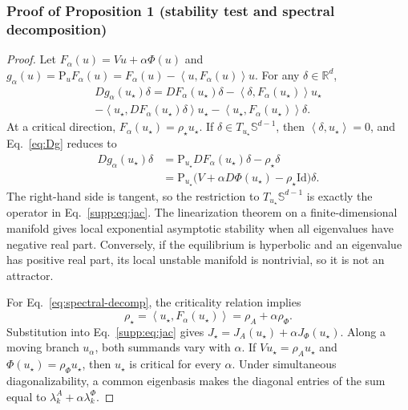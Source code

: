 \documentclass[11pt]{article}
\newcommand{\R}{\mathbb{R}}
\newcommand{\Sph}{\mathbb{S}}
\newcommand{\ip}[2]{\left\langle #1,#2 \right\rangle}
\newcommand{\Proj}{\mathrm{P}}
\newcommand{\id}{\mathrm{Id}}
\begin{document}
\subsubsection{Proof of Proposition 1 (stability test and spectral decomposition)}
\begin{proof}
Let
$F_\alpha(u)=Vu+\alpha\Phi(u)$ and
$g_\alpha(u)=\Proj_uF_\alpha(u)=F_\alpha(u)-\ip{u}{F_\alpha(u)}u$. For any
$\delta\in\R^d$,
\begin{multline}
Dg_\alpha(u_\star)\delta
=DF_\alpha(u_\star)\delta
-\ip{\delta}{F_\alpha(u_\star)}u_\star\\
-\ip{u_\star}{DF_\alpha(u_\star)\delta}u_\star
-\ip{u_\star}{F_\alpha(u_\star)}\delta.
\label{eq:Dg}
\end{multline}
At a critical direction,
$F_\alpha(u_\star)=\rho_\star u_\star$. If
$\delta\in T_{u_\star}\Sph^{d-1}$, then $\ip{\delta}{u_\star}=0$, and
Eq.~\eqref{eq:Dg} reduces to
\begin{align}
Dg_\alpha(u_\star)\delta
&=\Proj_{u_\star}DF_\alpha(u_\star)\delta-\rho_\star\delta\\
&=\Proj_{u_\star}
\big(V+\alpha D\Phi(u_\star)-\rho_\star\id\big)\delta.
\end{align}
The right-hand side is tangent, so the restriction to
$T_{u_\star}\Sph^{d-1}$ is exactly the operator in Eq.~\eqref{supp:eq:jac}.
The linearization theorem on a finite-dimensional manifold gives local
exponential asymptotic stability when all eigenvalues have negative real part.
Conversely, if the equilibrium is hyperbolic and an eigenvalue has positive real
part, its local unstable manifold is nontrivial, so it is not an attractor.

For Eq.~\eqref{eq:spectral-decomp}, the criticality relation implies
\begin{equation}
\rho_\star=\ip{u_\star}{F_\alpha(u_\star)}
=\rho_A+\alpha\rho_\Phi.
\end{equation}
Substitution into Eq.~\eqref{supp:eq:jac} gives
$J_\star=J_A(u_\star)+\alpha J_\Phi(u_\star)$. Along a moving branch
$u_\alpha$, both summands vary with $\alpha$. If
$Vu_\star=\rho_Au_\star$ and
$\Phi(u_\star)=\rho_\Phi u_\star$, then $u_\star$ is critical for every
$\alpha$. Under simultaneous diagonalizability, a common eigenbasis makes the
diagonal entries of the sum equal to
$\lambda_k^A+\alpha\lambda_k^\Phi$.
\end{proof}
\end{document}
